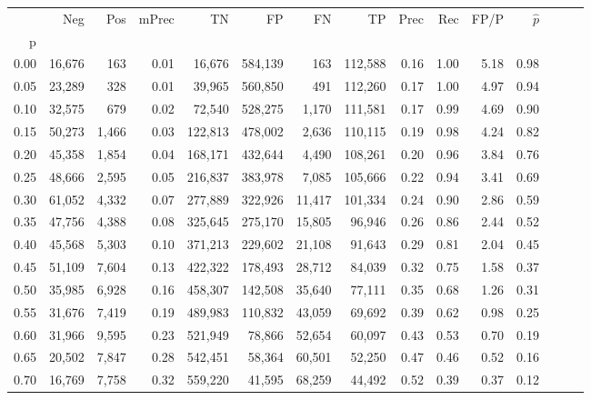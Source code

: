 \begin{tabular}{rrrrrrrrrrrrrrr}
\toprule
{} &     Neg &    Pos & mPrec &       TN &       FP &       FN &       TP &  Prec &   Rec &  FP/P & $\hat{p}$ \\
p    &         &        &       &          &          &          &          &       &       &       &           \\
\midrule
0.00 &  16,676 &    163 &  0.01 &   16,676 &  584,139 &      163 &  112,588 &  0.16 &  1.00 &  5.18 &      0.98 \\
0.05 &  23,289 &    328 &  0.01 &   39,965 &  560,850 &      491 &  112,260 &  0.17 &  1.00 &  4.97 &      0.94 \\
0.10 &  32,575 &    679 &  0.02 &   72,540 &  528,275 &    1,170 &  111,581 &  0.17 &  0.99 &  4.69 &      0.90 \\
0.15 &  50,273 &  1,466 &  0.03 &  122,813 &  478,002 &    2,636 &  110,115 &  0.19 &  0.98 &  4.24 &      0.82 \\
0.20 &  45,358 &  1,854 &  0.04 &  168,171 &  432,644 &    4,490 &  108,261 &  0.20 &  0.96 &  3.84 &      0.76 \\
0.25 &  48,666 &  2,595 &  0.05 &  216,837 &  383,978 &    7,085 &  105,666 &  0.22 &  0.94 &  3.41 &      0.69 \\
0.30 &  61,052 &  4,332 &  0.07 &  277,889 &  322,926 &   11,417 &  101,334 &  0.24 &  0.90 &  2.86 &      0.59 \\
0.35 &  47,756 &  4,388 &  0.08 &  325,645 &  275,170 &   15,805 &   96,946 &  0.26 &  0.86 &  2.44 &      0.52 \\
0.40 &  45,568 &  5,303 &  0.10 &  371,213 &  229,602 &   21,108 &   91,643 &  0.29 &  0.81 &  2.04 &      0.45 \\
0.45 &  51,109 &  7,604 &  0.13 &  422,322 &  178,493 &   28,712 &   84,039 &  0.32 &  0.75 &  1.58 &      0.37 \\
0.50 &  35,985 &  6,928 &  0.16 &  458,307 &  142,508 &   35,640 &   77,111 &  0.35 &  0.68 &  1.26 &      0.31 \\
0.55 &  31,676 &  7,419 &  0.19 &  489,983 &  110,832 &   43,059 &   69,692 &  0.39 &  0.62 &  0.98 &      0.25 \\
0.60 &  31,966 &  9,595 &  0.23 &  521,949 &   78,866 &   52,654 &   60,097 &  0.43 &  0.53 &  0.70 &      0.19 \\
0.65 &  20,502 &  7,847 &  0.28 &  542,451 &   58,364 &   60,501 &   52,250 &  0.47 &  0.46 &  0.52 &      0.16 \\
0.70 &  16,769 &  7,758 &  0.32 &  559,220 &   41,595 &   68,259 &   44,492 &  0.52 &  0.39 &  0.37 &      0.12 \\

\end{tabular}
